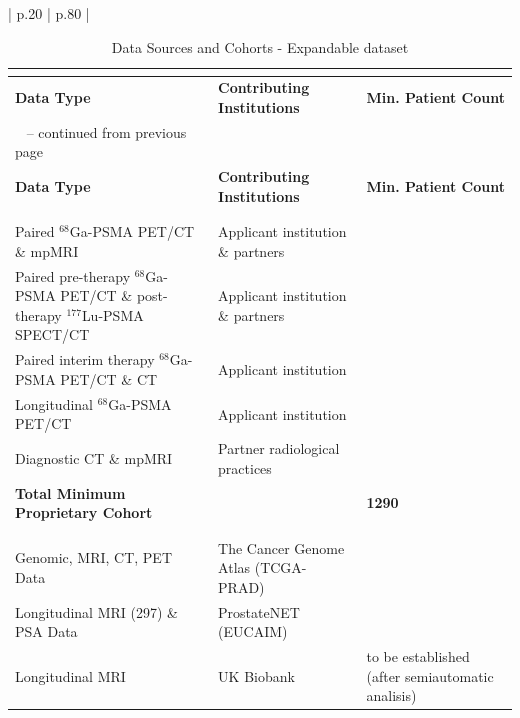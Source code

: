 \documentclass[11pt, a4paper]{article}
\begin{document}
\begin{longtable}{| p{} | p{} |}
\begin{longtable}{>{\RaggedRight}p{} >{\RaggedRight}p{} >{\RaggedRight\arraybackslash}p{}}
\caption{Data Sources and Cohorts - Expandable dataset }\\
\label{tab:data} \\
\toprule
\textbf{Data Type} & \textbf{Contributing Institutions} & \textbf{Min. Patient Count} \\
\midrule
\endfirsthead
\multicolumn{3}{c}%
{{\tablename\ \thetable{} -- continued from previous page}} \\
\toprule
\textbf{Data Type} & \textbf{Contributing Institutions} & \textbf{Min. Patient Count} \\
\midrule
\endhead
\bottomrule
\multicolumn{3}{r}{{Continued on next page}} \\
\endfoot
\endlastfoot
\multicolumn{3}{l}{\textbf{Proprietary Multi-Center Clinical Cohort}} \\
\midrule
Paired $^{68}$Ga-PSMA PET/CT \& mpMRI & Applicant institution \& partners & 450 \\
\cmidrule(lr){1-3}
Paired pre-therapy $^{68}$Ga-PSMA PET/CT \& post-therapy $^{177}$Lu-PSMA SPECT/CT & Applicant institution \& partners & 550 \\
\cmidrule(lr){1-3}
Paired interim therapy $^{68}$Ga-PSMA PET/CT \& CT & Applicant institution & 40 \\
\cmidrule(lr){1-3}
Longitudinal $^{68}$Ga-PSMA PET/CT & Applicant institution & 200 \\
\cmidrule(lr){1-3}
Diagnostic CT \& mpMRI & Partner radiological practices & 50 \\
\midrule
\textbf{Total Minimum Proprietary Cohort} & & \textbf{1290} \\
\midrule
\multicolumn{3}{p{\dimexpr\linewidth-2\tabcolsep}}{\small\textit{Note: The patient counts are minimum estimates and are expected to increase during the project.}} \\
\midrule
\multicolumn{3}{l}{\textbf{Integration with Public Datasets - Examples}} \\
\midrule
Genomic, MRI, CT, PET Data & The Cancer Genome Atlas (TCGA-PRAD) \cite{zuley2016cancer} & 14 \\

\cmidrule(lr){1-3}
Longitudinal MRI (297) \& PSA Data & ProstateNET (EUCAIM) \cite{prostateNetArchive} & 297 \\

\cmidrule(lr){1-3}
Longitudinal MRI  & UK Biobank &  to be established (after semiautomatic analisis) \\
\bottomrule


\end{longtable}
\end{longtable}
\end{document}
